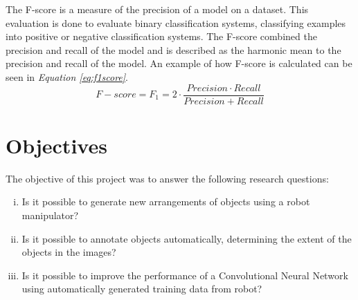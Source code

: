The F-score is a measure of the precision of a model on a dataset. This evaluation is done to evaluate binary classification systems, classifying examples into positive or negative classification systems. 
The F-score combined the precision and recall of the model and is described as the harmonic mean to the precision and recall of the model\cite{wood_f-score_2019}.
An example of how F-score is calculated can be seen in \textit{Equation \ref{eq:f1score}}.
\begin{equation}
    F- score = F_1 = 2 \cdot \frac{Precision \cdot Recall}{Precision + Recall}
    \label{eq:f1score}
\end{equation}


\section{Objectives}
The objective of this project was to answer the following research questions:
\begin{enumerate}[i.]
    \item Is it possible to generate new arrangements of objects using a robot manipulator?
    \item Is it possible to annotate objects automatically,  determining the extent of the objects in the images?
    \item Is it possible to improve the performance of a Convolutional Neural Network using automatically generated training data from robot? %
\end{enumerate}
